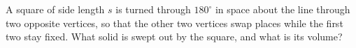 A square of side length $s$ is turned through $180^\circ$ in space about the line through two opposite vertices, so that the other two vertices swap places while the first two stay fixed. What solid is swept out by the square, and what is its volume?
